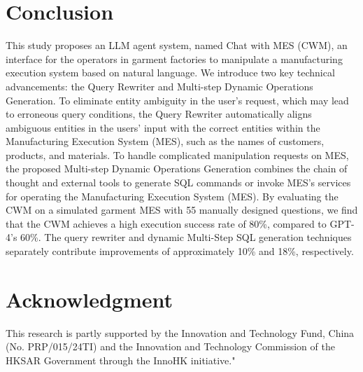 \documentclass[preprint,12pt]{elsarticle}
\begin{document}
\section{Conclusion}
\label{sec:conclusion}
This study proposes an LLM agent system, named Chat with MES (CWM), an interface for the operators in garment factories to manipulate a manufacturing execution system based on natural language.
We introduce two key technical advancements: the Query Rewriter and Multi-step Dynamic Operations Generation.
To eliminate entity ambiguity in the user's request, which may lead to erroneous query conditions, the Query Rewriter automatically aligns ambiguous entities in the users' input with the correct entities within the Manufacturing Execution System (MES), such as the names of customers, products, and materials.
To handle complicated manipulation requests on MES, the proposed Multi-step Dynamic Operations Generation combines the chain of thought and external tools to generate SQL commands or invoke MES's services for operating the Manufacturing Execution System (MES).
By evaluating the CWM on a simulated garment MES with 55 manually designed questions, we find that the CWM achieves a high execution success rate of 80\%, compared to GPT-4's 60\%. 
The query rewriter and dynamic Multi-Step SQL generation techniques separately contribute improvements of approximately 10\% and 18\%, respectively.

\section{Acknowledgment}
This research is partly supported by the Innovation and Technology Fund, China (No. PRP/015/24TI) and the Innovation and Technology Commission of the HKSAR Government through the InnoHK initiative."





\end{document}
